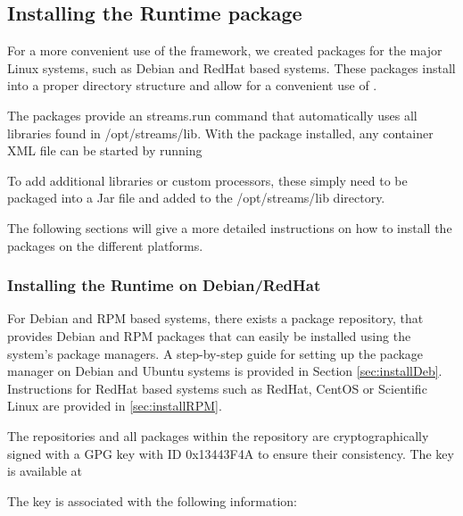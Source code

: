 \subsection{Installing the \streams Runtime package}
For a more convenient use of the \streams framework, we created packages
for the major Linux systems, such as Debian and RedHat based systems. These
packages install into a proper directory structure and allow for a convenient
use of \streams.

The packages provide an {\ttfamily streams.run} command that automatically
uses all libraries found in {\ttfamily /opt/streams/lib}. With the \streams
package installed, any container XML file can be started by running

\hspace{4ex}

To add additional libraries or custom processors, these simply need to be
packaged into a Jar file and added to the {\ttfamily /opt/streams/lib}
directory.

\medskip

The following sections will give a more detailed instructions on how
to install the \streams packages on the different platforms.


\subsubsection{Installing the \streams Runtime on Debian/RedHat}
For Debian and RPM based systems, there exists a package repository,
that provides Debian and RPM packages that can easily be installed
using the system's package managers. A step-by-step guide for setting
up the package manager on Debian and Ubuntu systems is provided in
Section \ref{sec:installDeb}. Instructions for RedHat based systems
such as RedHat, CentOS or Scientific Linux are provided in
\ref{sec:installRPM}.


The repositories and all packages within the repository are
cryptographically signed with a GPG key with ID {\ttfamily 0x13443F4A}
to ensure their consistency. The key is available at

\hspace{4ex}

The key is associated with the following information:

\hspace{4ex}



